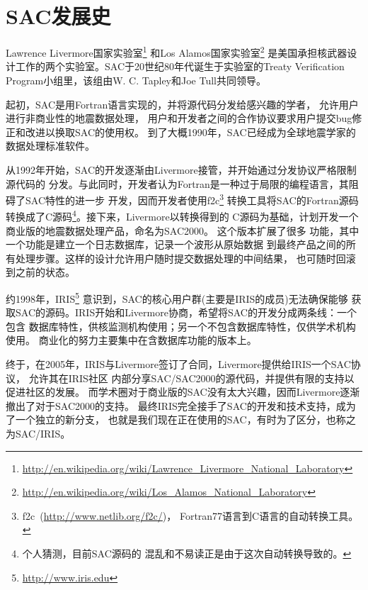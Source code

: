\section{SAC发展史}
\label{sec:history}

Lawrence Livermore国家实验室\footnote{\url{http://en.wikipedia.org/wiki/Lawrence\_Livermore\_National\_Laboratory}}
和Los Alamos国家实验室\footnote{\url{http://en.wikipedia.org/wiki/Los\_Alamos\_National\_Laboratory}}
是美国承担核武器设计工作的两个实验室。SAC于20世纪80年代诞生于实验室的Treaty Verification Program小组里，该组由W. C. Tapley和Joe Tull共同领导。

起初，SAC是用Fortran语言实现的，并将源代码分发给感兴趣的学者，
允许用户进行非商业性的地震数据处理，
用户和开发者之间的合作协议要求用户提交bug修正和改进以换取SAC的使用权。
到了大概1990年，SAC已经成为全球地震学家的数据处理标准软件。

从1992年开始，SAC的开发逐渐由Livermore接管，并开始通过分发协议严格限制源代码的
分发。与此同时，开发者认为Fortran是一种过于局限的编程语言，其阻碍了SAC特性的进一步
开发，因而开发者使用f2c\footnote{f2c~(\url{http://www.netlib.org/f2c/})，
Fortran77语言到C语言的自动转换工具。}
转换工具将SAC的Fortran源码转换成了C源码\footnote{个人猜测，目前SAC源码的
混乱和不易读正是由于这次自动转换导致的。}。接下来，Livermore以转换得到的
C源码为基础，计划开发一个商业版的地震数据处理产品，命名为SAC2000。
这个版本扩展了很多
功能，其中一个功能是建立一个日志数据库，记录一个波形从原始数据
到最终产品之间的所有处理步骤。这样的设计允许用户随时提交数据处理的中间结果，
也可随时回滚到之前的状态。

约1998年，IRIS\footnote{\url{http://www.iris.edu}}
意识到，SAC的核心用户群(主要是IRIS的成员)无法确保能够
获取SAC的源码。IRIS开始和Livermore协商，希望将SAC的开发分成两条线：一个包含
数据库特性，供核监测机构使用；另一个不包含数据库特性，仅供学术机构使用。
商业化的努力主要集中在含数据库功能的版本上。

终于，在2005年，IRIS与Livermore签订了合同，Livermore提供给IRIS一个SAC协议，
允许其在IRIS社区
内部分享SAC/SAC2000的源代码，并提供有限的支持以促进社区的发展。
而学术圈对于商业版的SAC没有太大兴趣，因而Livermore逐渐撤出了对于SAC2000的支持。
最终IRIS完全接手了SAC的开发和技术支持，成为了一个独立的新分支，
也就是我们现在正在使用的SAC，有时为了区分，也称之为SAC/IRIS。
